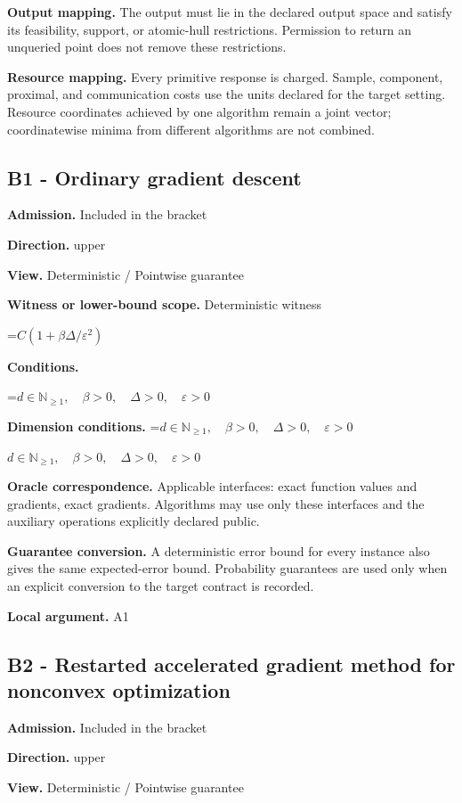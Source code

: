 \documentclass[10pt,a4paper]{article}
\newcommand{\AtlasMath}[1]{\par\begingroup\centering\setbox0=\hbox{$\displaystyle #1$}\ifdim\wd0>1.4\linewidth\typeout{ATLAS WIDE FORMULA: \the\wd0}\fi\ifdim\wd0>\linewidth\resizebox{\linewidth}{!}{\box0}\else\box0\fi\par\endgroup}
\newcommand{\AtlasInlineMath}[1]{\begingroup\setbox0=\hbox{$#1$}\ifdim\wd0>.4\linewidth\endgroup\AtlasMath{#1}\else\endgroup$#1$\fi}
\begin{document}
\textbf{Output mapping.} The output must lie in the declared output space and satisfy its feasibility, support, or atomic-hull restrictions. Permission to return an unqueried point does not remove these restrictions.

\textbf{Resource mapping.} Every primitive response is charged. Sample, component, proximal, and communication costs use the units declared for the target setting. Resource coordinates achieved by one algorithm remain a joint vector; coordinatewise minima from different algorithms are not combined.

\subsection{B1 - Ordinary gradient descent}
\textbf{Admission.} Included in the bracket

\textbf{Direction.} upper

\textbf{View.} Deterministic / Pointwise guarantee

\textbf{Witness or lower-bound scope.} Deterministic witness

\AtlasMath{C(1+\beta\Delta/\varepsilon^2)}
\textbf{Conditions.} 
\AtlasMath{d\in\mathbb{N}_{\ge1},\quad \beta>0,\quad \Delta>0,\quad \varepsilon>0}


\textbf{Dimension conditions.} \AtlasInlineMath{d\in\mathbb{N}_{\ge1},\quad \beta>0,\quad \Delta>0,\quad \varepsilon>0}

\textbf{Oracle correspondence.} Applicable interfaces: exact function values and gradients, exact gradients. Algorithms may use only these interfaces and the auxiliary operations explicitly declared public.

\textbf{Guarantee conversion.} A deterministic error bound for every instance also gives the same expected-error bound. Probability guarantees are used only when an explicit conversion to the target contract is recorded.

\textbf{Local argument.} A1

\subsection{B2 - Restarted accelerated gradient method for nonconvex optimization}
\textbf{Admission.} Included in the bracket

\textbf{Direction.} upper

\textbf{View.} Deterministic / Pointwise guarantee
\end{document}

